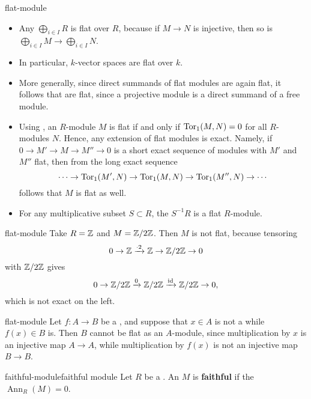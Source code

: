 \begin{example}{flat-module}
    \begin{itemize}
        \item Any  $\bigoplus_{i \in I} R$ is flat over $R$, because if $M \to N$ is injective, then so is $\bigoplus_{i \in I} M \to \bigoplus_{i \in I} N$.
        \item In particular, $k$-vector spaces are flat over $k$.
        \item More generally, since direct summands of flat modules are again flat, it follows that  are flat, since a projective module is a direct summand of a free module.
        \item Using , an $R$-module $M$ is flat if and only if $\textup{Tor}_1(M, N) = 0$ for all $R$-modules $N$. Hence, any extension of flat modules is exact. Namely, if $0 \to M' \to M \to M'' \to 0$ is a short exact sequence of modules with $M'$ and $M''$ flat, then from the long exact sequence
        \[ \cdots \to \textup{Tor}_1(M', N) \to \textup{Tor}_1(M, N) \to \textup{Tor}_1(M'', N) \to \cdots \]
        follows that $M$ is flat as well.
        \item For any multiplicative subset $S \subset R$, the  $S^{-1} R$ is a flat $R$-module.
    \end{itemize}
\end{example}

\begin{example}{flat-module}
    Take $R = \mathbb{Z}$ and $M = \mathbb{Z}/2\mathbb{Z}$. Then $M$ is not flat, because tensoring
    \[ 0 \rightarrow \mathbb{Z} \xrightarrow{\cdot 2} \mathbb{Z} \rightarrow \mathbb{Z}/2\mathbb{Z} \to 0 \]
    with $\mathbb{Z}/2\mathbb{Z}$ gives
    \[ 0 \rightarrow \mathbb{Z}/2\mathbb{Z} \xrightarrow{0} \mathbb{Z}/2\mathbb{Z} \xrightarrow{\textup{id}} \mathbb{Z}/2\mathbb{Z} \to 0 , \]
    which is not exact on the left.
\end{example}

\begin{example}{flat-module}
    Let $f : A \to B$ be a , and suppose that $x \in A$ is not a  while $f(x) \in B$ is. Then $B$ cannot be flat as an $A$-module, since multiplication by $x$ is an injective map $A \to A$, while multiplication by $f(x)$ is not an injective map $B \to B$.
\end{example}

\begin{topic}{faithful-module}{faithful module}
     Let $R$ be a . An  $M$ is \textbf{faithful} if the  $\operatorname{Ann}_R(M) = 0$.
\end{topic}

